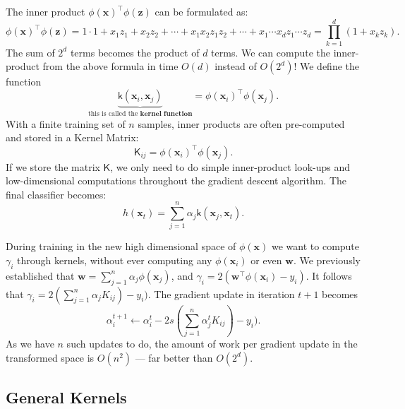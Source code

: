 \documentclass[12pt]{article}
\begin{document}
 
 The inner product $\phi(\mathbf{x})^\top \phi(\mathbf{z})$ can be formulated as: 
 \begin{equation}
 \phi(\mathbf{x})^\top \phi(\mathbf{z})=1\cdot 1+x_1z_1+x_2z_2+\cdots +x_1x_2z_1z_2+ \cdots +x_1\cdots x_dz_1\cdots z_d=\prod_{k=1}^d(1+x_kz_k)\text{.}\label{eq:c15:poly}
 \end{equation}
 The sum of $2^d$ terms becomes the product of $d$ terms. We can compute the inner-product from the above formula in time $O(d)$ instead of $O(2^d)$! 
 We define the function 
 \begin{equation}
 \underbrace{\mathsf{k}(\mathbf{x}_i,\mathbf{x}_j)}_{\text{this is called the} \textbf{ kernel function}}=\phi(\mathbf{x}_i)^\top \phi(\mathbf{x}_j).
 \end{equation}
 With a finite training set of $n$ samples, inner products are often pre-computed and stored in a Kernel Matrix:
 \begin{equation}
 \mathsf{K}_{ij}=\phi(\mathbf{x}_i)^\top \phi(\mathbf{x}_j).
 \end{equation}
 If we store the matrix $\mathsf{K}$, we only need to do simple inner-product look-ups and low-dimensional computations throughout the gradient descent algorithm. 
 The final classifier becomes:
 \begin{equation}
 h(\mathbf{x}_t)=\sum_{j=1}^n\alpha_j\mathsf{k}(\mathbf{x}_j,\mathbf{x}_t).
 \end{equation}
 
 During training in the new high dimensional space of $\phi(\mathbf{x})$ we want to compute $\gamma_i$ through kernels, without ever computing any $\phi(\mathbf{x}_i)$ or even $\mathbf{w}$. We previously established that $\mathbf{w}=\sum_{j=1}^n\alpha_j \phi(\mathbf{x}_j)$, and 
 $\gamma_i=2(\mathbf{w}^\top \phi(\mathbf{x}_i)-y_i)$. It follows that $\gamma_i=2(\sum_{j=1}^n \alpha_jK_{ij})-y_i)$. The gradient update in iteration $t+1$ becomes $$\alpha_i^{t+1}\leftarrow \alpha_i^t-2s(\sum_{j=1}^n \alpha_j^tK_{ij})-y_i).$$
 As we have $n$ such updates to do, the amount of work per gradient update in the transformed space is $O(n^2)$ --- far better than $O(2^d)$. 
 
 \cleardoublepage
 \subsection{General Kernels}
 
 
\end{document}
